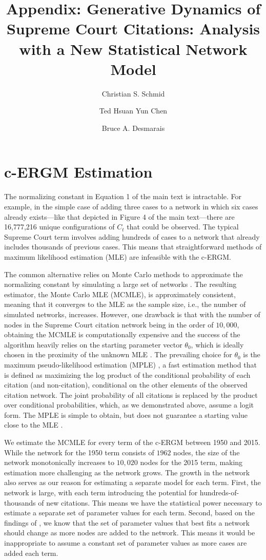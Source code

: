 \documentclass{cup-pan}
\title{Appendix: Generative Dynamics of Supreme Court Citations: Analysis with a New Statistical Network Model}
\author[1]{Christian S. Schmid}
\author[2]{Ted Hsuan Yun Chen}
\author[3]{Bruce A. Desmarais}
\affil[1]{Department of Statistics, The Pennsylvania State University, University Park, PA. Email: \url{schmid@psu.edu}}
\affil[2]{Faculty of Social Sciences, University of Helsinki, Finland. Email: \url{ted.hsuanyun.chen@gmail.com}}
\affil[3]{Department of Political Science, The Pennsylvania State University, University Park, PA. Email: \url{bdesmarais@psu.edu}}
\begin{document}
\maketitle


\section{c-ERGM Estimation}

The normalizing constant in Equation 1 of the main text is intractable. For example, in the simple case of adding three cases to a network in which six cases already exists---like that depicted in Figure 4 of the main text---there are 16,777,216 unique configurations of $C_t$ that could be observed. The typical Supreme Court term involves adding hundreds of cases to a network that already includes thousands of previous cases. This means that straightforward methods of maximum likelihood estimation (MLE) are infeasible with the c-ERGM. 

The common alternative relies on Monte Carlo methods to approximate the normalizing constant by simulating a large set of networks \citep{hunter2006inference,hummel2012improving}. The resulting estimator, the Monte Carlo MLE (MCMLE), is approximately consistent, meaning that it converges to the MLE as the sample size, i.e., the number of simulated networks, increases. However, one drawback is that with the number of nodes in the Supreme Court citation network being in the order of $10,000$, obtaining the MCMLE is computationally expensive \citep{schmid2017exponential} and the success of the algorithm heavily relies on the starting parameter vector $\theta_0$, which is ideally chosen in the proximity of the unknown MLE \citep{hummel2012improving}. The prevailing choice for $\theta_0$ is the maximum pseudo-likelihood estimation (MPLE) \citep{strauss1990pseudolikelihood}, a fast estimation method that is defined as maximizing the log product of the conditional probability of each citation (and non-citation), conditional on the other elements of the observed citation network. The joint probability of all citations is replaced by the product over conditional probabilities, which, as we demonstrated above, assume a logit form. The MPLE is simple to obtain, but does not guarantee a starting value close to the MLE \citep{SchmidHunter2020}. 

We estimate the MCMLE for every term of the c-ERGM between 1950 and 2015. While the network for the 1950 term consists of $1962$ nodes, the size of the network monotonically increases to $10,020$ nodes for the 2015 term, making estimation more challenging as the network grows. The growth in the network also serves as our reason for estimating a separate model for each term. First, the network is large, with each term introducing the potential for hundreds-of-thousands of new citations. This means we have the statistical power necessary to estimate a separate set of parameter values for each term. Second, based on the findings of \citet{shalizi2013consistency}, we know that the set of parameter values that best fits a network should change as more nodes are added to the network. This means it would be inappropriate to assume a constant set of parameter values as more cases are added each term. 
\end{document}
